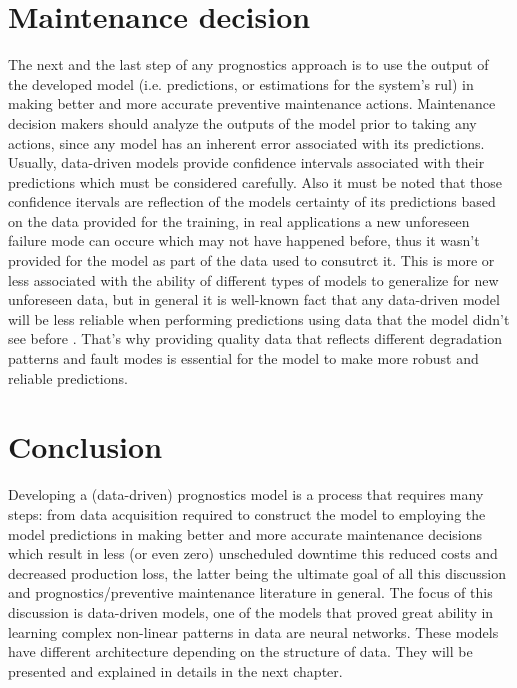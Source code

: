 \section{Maintenance decision}
The next and the last step of any prognostics approach is to use the output of the developed model (i.e. predictions, or estimations for the system's \acrshort{rul}) in making better and more accurate preventive maintenance actions. Maintenance decision makers should analyze the outputs of the model prior to taking any actions, since any model has an inherent error associated with its predictions. Usually, data-driven models provide confidence intervals associated with their predictions which must be considered carefully. Also it must be noted that those confidence itervals are reflection of the models certainty of its predictions based on the data provided for the training, in real applications a new unforeseen failure mode can occure which may not have happened before, thus it wasn't provided for the model as part of the data used to consutrct it. This is more or less associated with the ability of different types of models to generalize for new unforeseen data, but in general it is well-known fact that any data-driven model will be less reliable when performing predictions using data that the model didn't see before \cite{Chung2018}. That's why providing quality data that reflects different degradation patterns and fault modes is essential for the model to make more robust and reliable predictions.

\section{Conclusion}
Developing a (data-driven) prognostics model is a process that requires many steps: from data acquisition required to construct the model to employing the model predictions in making better and more accurate maintenance decisions which result in less (or even zero) unscheduled downtime this reduced costs and decreased production loss, the latter being the ultimate goal of all this discussion and prognostics/preventive maintenance literature in general. The focus of this discussion is data-driven models, one of the models that proved great ability in learning complex non-linear patterns in data are neural networks. These models have different architecture depending on the structure of data. They will be presented and explained in details in the next chapter.

